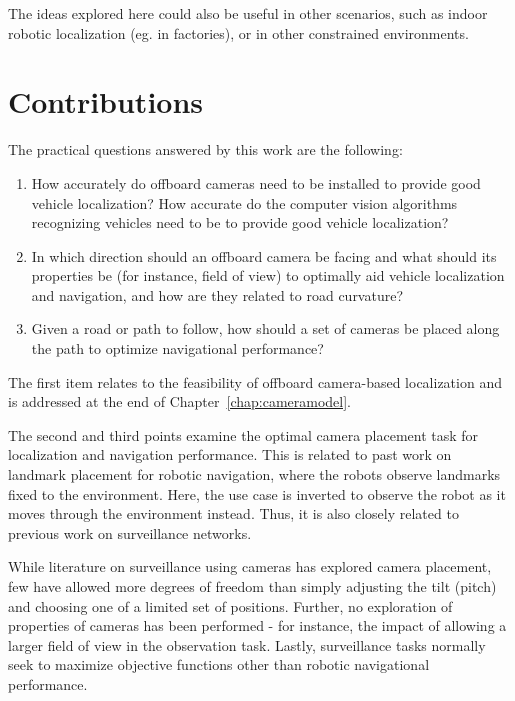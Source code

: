 \documentclass[a4paper,12pt,twoside,openright]{report}
\begin{document}
The ideas explored here could also be useful in other scenarios, such as indoor
robotic localization (eg. in factories), or in other constrained environments.

\section{Contributions}

The practical questions answered by this work are the following:
\begin{enumerate}
    \item How accurately do offboard cameras need to be installed to provide good vehicle localization? How accurate do the computer vision
    algorithms recognizing vehicles need to be to provide good vehicle localization?
    \item In which direction should an offboard camera be facing and what should its properties be (for instance, field of view)
          to optimally aid vehicle localization and navigation, and how are they related to road curvature?
    \item Given a road or path to follow, how should a set of cameras be placed along the path to optimize navigational performance?
\end{enumerate}

The first item relates to the feasibility of offboard camera-based localization
and is addressed at the end of Chapter~\ref{chap:cameramodel}.

The second and third points examine the optimal camera placement task 
for localization and navigation performance. This is related to past work 
on landmark placement for robotic navigation, where the robots observe landmarks fixed to the environment. 
Here, the use case is inverted to observe the robot as it moves through the environment instead. 
Thus, it is also closely related to previous work on surveillance networks.

While literature on surveillance using cameras has explored camera placement, few
have allowed more degrees of freedom than simply adjusting the tilt (pitch) 
and choosing one of a limited set of positions. Further, no exploration of 
properties of cameras has been performed - for instance, the impact
of allowing a larger field of view in the observation task. Lastly, surveillance
tasks normally seek to maximize objective functions other than robotic
navigational performance.
\end{document}
